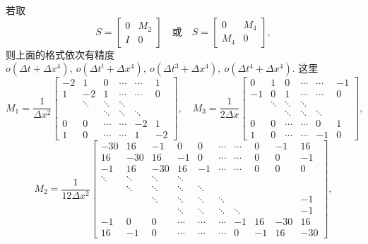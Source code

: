 若取
\begin{equation*}
	S=\begin{bmatrix}
		0&M_2\\
		I&0
	\end{bmatrix}\quad \text{或} \quad S=\begin{bmatrix}
		0&M_4\\
		M_4&0
	\end{bmatrix},
\end{equation*}
则上面的格式依次有精度 $o(\Delta t+\Delta x^4),~o(\Delta t^t+\Delta x^4),~o(\Delta t^3+\Delta x^4),~o(\Delta t^4+\Delta x^4)$.
这里
\begin{equation*}
	M_1=\frac{1}{\Delta x^2}\begin{bmatrix}
		-2&1&0&\cdots&\cdots&1\\
		1&-2&1&\cdots&\cdots&0\\
		&\ddots&\ddots&\ddots&&\\
		&&\ddots&\ddots&\ddots&\\
		0&0&\cdots&\cdots&-2&1\\
		1&0&\cdots&\cdots&1&-2
	\end{bmatrix},\quad M_3=\frac{1}{2\Delta x}\begin{bmatrix}
		0&1&0&\cdots&\cdots&-1\\
		-1&0&1&\cdots&\cdots&0\\
		&\ddots&\ddots&\ddots&&\\
		&&\ddots&\ddots&\ddots&\\
		0&0&\cdots&\cdots&0&1\\
		1&0&\cdots&\cdots&-1&0
	\end{bmatrix},
\end{equation*}
\begin{equation*}
	M_2=\frac{1}{12\Delta x^2}\begin{bmatrix}
-30 & 16 & -1 & 0 & 0 & \cdots & \cdots & 0 & -1 & 16 \\
16 & -30 & 16 & -1 & 0 & \cdots & \cdots & 0 & 0 & -1 \\
-1 & 16 & -30 & 16 & -1 & \cdots & \cdots & 0 & 0 & 0 \\
\ddots & \ddots & \ddots & \ddots &   &   &   &   &   &   \\
&\ddots & \ddots & \ddots & \ddots &   &   &   &   &\\
&&\ddots & \ddots & \ddots & \ddots &   &   &   &-1\\
&&&\ddots & \ddots & \ddots & \ddots &   &   &-1\\
-1 & 0 & 0 & \cdots & \cdots & \cdots & -1 & 16 & -30 & 16 \\
16 & -1 & 0 & \cdots & \cdots & \cdots & 0 & -1 & 16 & -30
\end{bmatrix},
\end{equation*}
